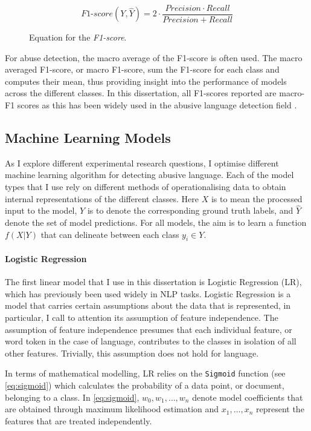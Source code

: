 \begin{figure}[h]
  \begin{equation}\label{eq:f1score}
    \mathit{F1}\text{-}score(Y,\hat{Y}) = 2\cdot\frac{Precision \cdot Recall}{Precision + Recall}
  \end{equation}
  \caption{Equation for the \textit{F1-score}.}
\end{figure}

For abuse detection, the macro average of the F1-score is often used. 
The macro averaged F1-score, or macro F1-score, sum the F1-score for each class and computes their mean, thus providing insight into the performance of models across the different classes.
In this dissertation, all F1-scores reported are macro-F1 scores as this has been widely used in the abusive language detection field \citep{Fortuna:2021}.

\subsection{Machine Learning Models}

As I explore different experimental research questions, I optimise different machine learning algorithm for detecting abusive language. 
Each of the model types that I use rely on different methods of operationalising data to obtain internal representations of the different classes. 
Here $X$ is to mean the processed input to the model, $Y$ is to denote the corresponding ground truth labels, and $\hat{Y}$ denote the set of model predictions. 
For all models, the aim is to learn a function $f(X|Y)$ that can delineate between each class $y_i\in Y$.

\paragraph{Logistic Regression}
The first linear model that I use in this dissertation is Logistic Regression (LR), which has previously been used widely in NLP tasks. 
Logistic Regression is a model that carries certain assumptions about the data that is represented, in particular, I call to attention its assumption of feature independence. 
The assumption of feature independence presumes that each individual feature, or word token in the case of language, contributes to the classes in isolation of all other features. 
Trivially, this assumption does not hold for language.

In terms of mathematical modelling, LR relies on the \texttt{Sigmoid} function (see \autoref{eq:sigmoid}) which calculates the probability of a data point, or document, belonging to a class. 
In \autoref{eq:sigmoid}, $w_0, w_1, \ldots, w_n$ denote model coefficients that are obtained through maximum likelihood estimation and $x_1, \ldots, x_n$ represent the features that are treated independently.

